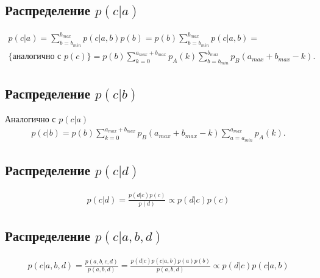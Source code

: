 \documentclass[12pt, a4paper]{article}
\begin{document}
        \subsection{Распределение $p(c|a)$}
            \begin{gather}
                p(c|a) = \sum_{b={b_{min}}}^{{b_{max}}} p(c|a,b) p(b) = p(b) \sum_{b={b_{min}}}^{{b_{max}}} p(c|a,b) = \nonumber\\
                \{\text{аналогично с } p(c)\}= p(b)\sum_{k=0}^{a_{max} + b_{max}} p_A(k) \sum_{b={b_{min}}}^{{b_{max}}}p_B(a_{max} + b_{max}-k).
            \end{gather}

        \subsection{Распределение $p(c|b)$}
            Аналогично с $p(c|a)$
            \begin{gather}
                p(c|b) = p(b)\sum_{k=0}^{a_{max} + b_{max}} p_B(a_{max} + b_{max}-k) \sum_{a={a_{min}}}^{{a_{max}}}p_A(k).
            \end{gather}

        \subsection{Распределение $p(c|d)$}
            \begin{gather}
                p(c|d) = \frac{p(d|c)p(c)}{p(d)} \propto p(d|c)p(c)
            \end{gather}

        \subsection{Распределение $p(c|a,b,d)$}
            \begin{gather}
                p(c|a,b,d) = \frac{p(a,b,c,d)}{p(a,b,d)} = \frac{p(d|c)p(c|a,b)p(a)p(b)}{p(a,b,d)} \propto p(d|c)p(c|a,b)
            \end{gather}
\end{document}
